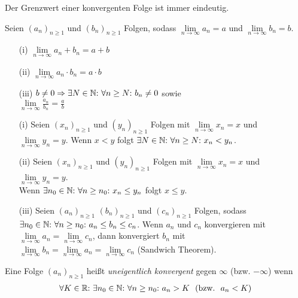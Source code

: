 \begin{framedthm}
	Der Grenzwert einer konvergenten Folge ist immer eindeutig.
\end{framedthm}

\begin{framedthm}
	Seien $(a_n)_{n\geq 1}$ und $(b_n)_{n\geq 1}$ Folgen, sodass $\lim\limits_{n \to \infty} a_n = a$ und $\lim\limits_{n \to \infty} b_n = b$.
	\begin{enumerate}
		\item[(i)]  $\lim\limits_{n \to \infty} a_n + b_n = a + b$
		\item[(ii)]  $\lim\limits_{n \to \infty} a_n \cdot b_n = a \cdot b$
		\item[(iii)] $b \neq 0 \Rightarrow \exists N \in \mathbb{N}{:}\  \forall n \geq N{:}\  b_n \neq 0$ sowie \\
		$\lim\limits_{n \to \infty} \frac{a_n}{b_n} = \frac{a}{b}$ 
	\end{enumerate}
	
\end{framedthm}

\begin{framedthm}
	\begin{enumerate}
		\item[(i)] Seien $(x_n)_{n\geq 1}$ und $(y_n)_{n\geq 1}$ Folgen mit $\lim\limits_{n \to \infty} x_n = x$ und $\lim\limits_{n \to \infty} y_n = y$. Wenn $x < y$ folgt $\exists N \in \mathbb{N}{:}\  \forall n \geq N{:}\  x_n < y_n$.
		\item[(ii)] Seien $(x_n)_{n\geq 1}$ und $(y_n)_{n\geq 1}$ Folgen mit $\lim\limits_{n \to \infty} x_n = x$ und $\lim\limits_{n \to \infty} y_n = y$.\\Wenn $\exists n_0 \in \mathbb{N}{:}\ \forall n \geq n_0{:}\  x_n \leq y_n$ folgt $x \leq y$.
		\item[(iii)] Seien $(a_n)_{n\geq 1}$ $(b_n)_{n\geq 1}$ und $(c_n)_{n\geq 1}$ Folgen, sodass $\exists n_0 \in \mathbb{N}{:}\ \forall n\geq n_0{:}\  a_n \leq b_n \leq c_n$. Wenn $a_n$ und $c_n$ konvergieren mit $\lim\limits_{n \to \infty} a_n = \lim\limits_{n \to \infty} c_n$, dann konvergiert $b_n$ mit\\$\lim\limits_{n \to \infty} b_n = \lim\limits_{n \to \infty} a_n = \lim\limits_{n \to \infty} c_n$ (Sandwich Theorem).
	\end{enumerate}
\end{framedthm}

\begin{frameddefn}
	Eine Folge $(a_n)_{n\geq 1}$ heißt \textit{uneigentlich konvergent} gegen $\infty$ (bzw. $-\infty$) wenn 
	\begin{align*}
		\forall K \in \mathbb{R}{:}\  \exists n_0 \in \mathbb{N}{:}\  \forall n \geq n_0{:}\  a_n > K\ \ \textrm{(bzw.}\ \  a_n < K\textrm{)}
	\end{align*}
	
\end{frameddefn}



